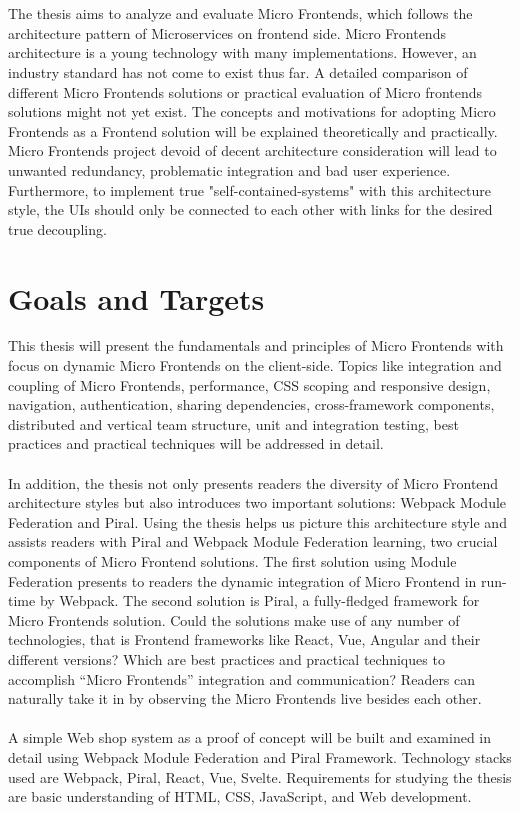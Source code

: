 \documentclass[a4paper]{book}
\begin{document}
\\
\\
The thesis aims to analyze and evaluate Micro Frontends, which follows the architecture pattern of Microservices on frontend side. Micro Frontends architecture is a young technology with many implementations. However, an industry standard has not come to exist thus far. A detailed comparison of different Micro Frontends solutions or practical evaluation of Micro frontends solutions might not yet exist. The concepts and motivations for adopting Micro Frontends as a Frontend solution will be explained theoretically and practically. Micro Frontends project devoid of decent architecture consideration will lead to unwanted redundancy, problematic integration and bad user experience. Furthermore, to implement true "self-contained-systems" with this architecture style, the UIs should only be connected to each other with links for the desired true decoupling. 

\section{Goals and Targets}
This thesis will present the fundamentals and principles of Micro Frontends with focus on dynamic Micro Frontends on the client-side. Topics like integration and coupling of Micro Frontends, performance, CSS scoping and responsive design, navigation, authentication, sharing dependencies, cross-framework components, distributed and vertical team structure, unit and integration testing, best practices and practical techniques will be addressed in detail. 
\\
\\
In addition, the thesis not only presents readers the diversity of Micro Frontend architecture styles but also introduces two important solutions: Webpack Module Federation and Piral. Using the thesis helps us picture this architecture style and assists readers with Piral and Webpack Module Federation learning, two crucial components of Micro Frontend solutions. The first solution using Module Federation presents to readers the dynamic integration of Micro Frontend in run-time by Webpack. The second solution is Piral, a fully-fledged framework for Micro Frontends solution. Could the solutions make use of any number of technologies, that is Frontend frameworks like React, Vue, Angular and their different versions? Which are best practices and practical techniques to accomplish “Micro Frontends” integration and communication? Readers can naturally take it in by observing the Micro Frontends live besides each other.
\\
\\
A simple Web shop system as a proof of concept will be built and examined in detail using Webpack Module Federation and Piral Framework. Technology stacks used are Webpack, Piral, React, Vue, Svelte. Requirements for studying the thesis are basic understanding of HTML, CSS, JavaScript, and Web development.
\end{document}
